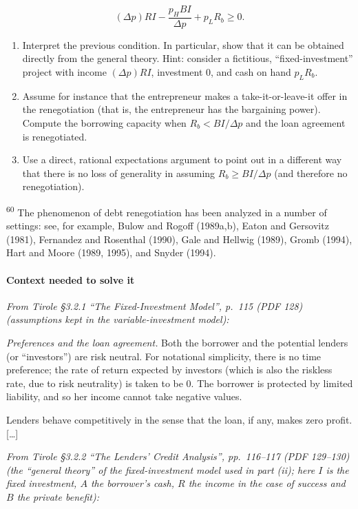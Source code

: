 \documentclass[11pt,a4paper]{article}
\begin{document}
\[(\Delta p)RI - \frac{p_H BI}{\Delta p} + p_L R_b \geqslant 0.\]

\begin{enumerate}
\def\labelenumi{(\roman{enumi})}
\setcounter{enumi}{1}
\item
  Interpret the previous condition. In particular, show that it can be obtained directly from the
  general theory. Hint: consider a fictitious, ``fixed-investment'' project with income
  \((\Delta p)RI\), investment 0, and cash on hand \(p_L R_b\).
\item
  Assume for instance that the entrepreneur makes a take-it-or-leave-it offer in the renegotiation
  (that is, the entrepreneur has the bargaining power). Compute the borrowing capacity when
  \(R_b < BI/\Delta p\) and the loan agreement is renegotiated.
\item
  Use a direct, rational expectations argument to point out in a different way that there is no loss
  of generality in assuming \(R_b \geqslant BI/\Delta p\) (and therefore no renegotiation).
\end{enumerate}

\textsuperscript{60} The phenomenon of debt renegotiation has been analyzed in a number of settings:
see, for example, Bulow and Rogoff (1989a,b), Eaton and Gersovitz (1981), Fernandez and Rosenthal
(1990), Gale and Hellwig (1989), Gromb (1994), Hart and Moore (1989, 1995), and Snyder (1994).

\paragraph{Context needed to solve it}

\emph{From Tirole §3.2.1 ``The Fixed-Investment Model'', p.~115 (PDF 128) (assumptions kept in the
variable-investment model):}

\emph{Preferences and the loan agreement.} Both the borrower and the potential lenders (or
``investors'') are risk neutral. For notational simplicity, there is no time preference; the rate of
return expected by investors (which is also the riskless rate, due to risk neutrality) is taken to
be 0. The borrower is protected by limited liability, and so her income cannot take negative values.

Lenders behave competitively in the sense that the loan, if any, makes zero profit. {[}\ldots{]}

\emph{From Tirole §3.2.2 ``The Lenders' Credit Analysis'', pp.~116--117 (PDF 129--130) (the
``general theory'' of the fixed-investment model used in part (ii); here \(I\) is the fixed
investment, \(A\) the borrower's cash, \(R\) the income in the case of success and \(B\) the private
benefit):}
\end{document}
